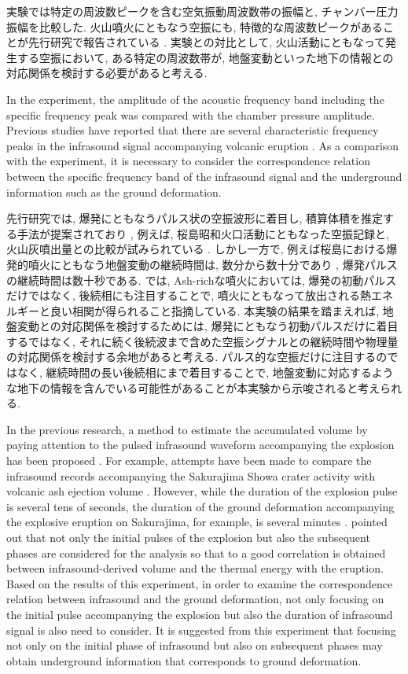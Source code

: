 \documentclass[12pt]{article}
\begin{document}
実験では特定の周波数ピークを含む空気振動周波数帯の振幅と, チャンバー圧力振幅を比較した. 
火山噴火にともなう空振にも, 特徴的な周波数ピークがあることが先行研究で報告されている \citep{yokoo2012bo}. 
実験との対比として, 火山活動にともなって発生する空振において, ある特定の周波数帯が, 地盤変動といった地下の情報との対応関係を検討する必要があると考える.

In the experiment, the amplitude of the acoustic frequency band including the specific frequency peak was compared with the chamber pressure amplitude.
Previous studies have reported that there are several characteristic frequency peaks in the infrasound signal accompanying volcanic eruption \citep{yokoo2012bo}.
As a comparison with the experiment, it is necessary to consider the correspondence relation between the specific frequency band of the infrasound signal and the underground information such as the ground deformation.

先行研究では, 爆発にともなうパルス状の空振波形に着目し, 積算体積を推定する手法が提案されており \citep{Johnson2003}, 例えば, 桜島昭和火口活動にともなった空振記録と, 火山灰噴出量との比較が試みられている \citep{Fee2017a}. 
しかし一方で, 例えば桜島における爆発的噴火にともなう地盤変動の継続時間は, 数分から数十分であり \citep{Iguchi2012, Iguchi2013a}, 爆発パルスの継続時間は数十秒である.
\cite{DelleDonne2016} では, Ash-richな噴火においては, 爆発の初動パルスだけではなく, 後続相にも注目することで, 噴火にともなって放出される熱エネルギーと良い相関が得られること指摘している. 
本実験の結果を踏まえれば, 地盤変動との対応関係を検討するためには, 爆発にともなう初動パルスだけに着目するではなく, それに続く後続波まで含めた空振シグナルとの継続時間や物理量の対応関係を検討する余地があると考える. 
パルス的な空振だけに注目するのではなく, 継続時間の長い後続相にまで着目することで, 地盤変動に対応するような地下の情報を含んでいる可能性があることが本実験から示唆されると考えられる.

In the previous research, a method to estimate the accumulated volume by paying attention to the pulsed infrasound waveform accompanying the explosion has been proposed \citep{Johnson2003}.
For example, attempts have been made to compare the infrasound records accompanying the Sakurajima Showa crater activity with volcanic ash ejection volume \citep{Fee2017a}.
However, while the duration of the explosion pulse is several tens of seconds, the duration of the ground deformation accompanying the explosive eruption on Sakurajima, for example, is several minutes \citep{Iguchi2012, Iguchi2013a}.
\cite{DelleDonne2016} pointed out that not only the initial pulses of the explosion but also the subsequent phases are considered for the analysis so that to a good correlation is obtained between infrasound-derived volume and the thermal energy with the eruption.
Based on the results of this experiment, in order to examine the correspondence relation between infrasound and the ground deformation, not only focusing on the initial pulse accompanying the explosion but also the duration of infrasound signal is also need to consider.
It is suggested from this experiment that focusing not only on the initial phase of infrasound but also on subsequent phases may obtain underground information that corresponds to ground deformation.
\end{document}
